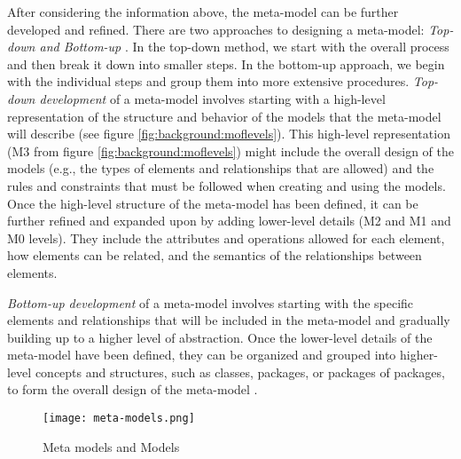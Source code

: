 After considering the information above, the meta-model can be further developed and refined. 
There are two approaches to designing a meta-model: \textit{Top-down and Bottom-up} \cite{misc:mbse:mof}. 
In the top-down method, we start with the overall process and then break it down into smaller steps. 
In the bottom-up approach, we begin with the individual steps and group them into more extensive procedures.
\textit{Top-down development} of a meta-model involves starting with a high-level representation of the structure and behavior of the models that the meta-model will describe (see figure \ref{fig:background:moflevels}). 
This high-level representation (M3 from figure \ref{fig:background:moflevels}) might include the overall design of the models (e.g., the types of elements and relationships that are allowed) and the rules and constraints that must be followed when creating and using the models.
Once the high-level structure of the meta-model has been defined, it can be further refined and expanded upon by adding lower-level details (M2 and M1 and M0 levels). 
They include the attributes and operations allowed for each element, how elements can be related, and the semantics of the relationships between elements.

\textit{Bottom-up development} of a meta-model involves starting with the specific elements and relationships that will be included in the meta-model and gradually building up to a higher level of abstraction. 
Once the lower-level details of the meta-model have been defined, they can be organized and grouped into higher-level concepts and structures, such as classes, packages, or packages of packages, to form the overall design of the meta-model \cite{misc:mbse:mof}.
\begin{figure}[htbp!]
  \centering    
  \texttt{[image: meta-models.png]}
  \caption[Meta models]{Meta models and Models}
  \label{fig:background:m1m2}
\end{figure}

